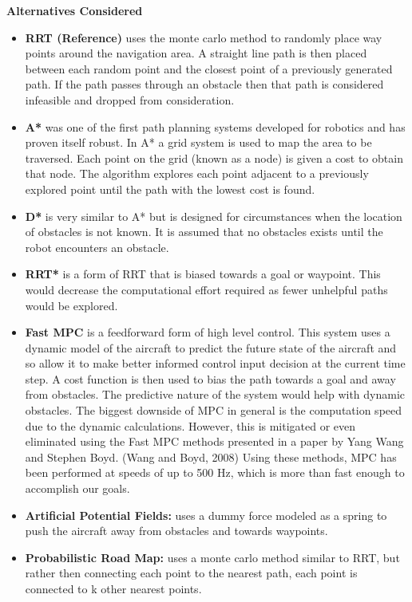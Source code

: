 \textbf{Alternatives Considered}
\begin{itemize}
\item \textbf{RRT (Reference)} uses the monte carlo method to randomly place way points around the navigation area. A straight line path is then placed between each random point and the closest point of a previously generated path. If the path passes through an obstacle then that path is considered infeasible and dropped from consideration.
\item \textbf{A*}  was one of the first path planning systems developed for robotics and has proven itself robust. In A* a grid system is used to map the area to be traversed. Each point on the grid (known as a node) is given a cost to obtain that node. The algorithm explores each point adjacent to a previously explored point until the path with the lowest cost is found.
\item \textbf{D*} is very similar to A* but is designed for circumstances when the location of obstacles is not known. It is assumed that no obstacles exists until the robot encounters an obstacle.
\item \textbf{RRT*} is a form of RRT that is biased towards a goal or waypoint. This would decrease the computational effort required as fewer unhelpful paths would be explored.
\item \textbf{Fast MPC} is a feedforward form of high level control. This system uses a dynamic model of the aircraft to predict the future state of the aircraft and so allow it to make better informed control input decision at the current time step. A cost function is then used to bias the path towards a goal and away from obstacles. The predictive nature of the system would help with dynamic obstacles. The biggest downside of MPC in general is the computation speed due to the dynamic calculations. However, this is mitigated or even eliminated using the Fast MPC methods presented in a paper by Yang Wang and Stephen Boyd. (Wang and Boyd, 2008) Using these methods, MPC has been performed at speeds of up to 500 Hz, which is more than fast enough to accomplish our goals.
\item \textbf{Artificial Potential Fields:} uses a dummy force modeled as a spring to push the aircraft away from obstacles and towards waypoints.
\item \textbf{Probabilistic Road Map:} uses a monte carlo method similar to RRT, but rather then connecting each point to the nearest path, each point is connected to k other nearest points.
\end{itemize}

